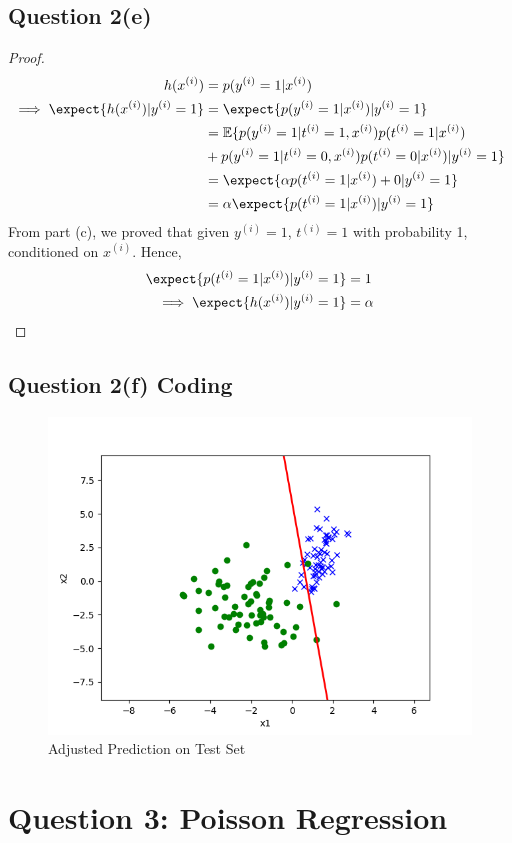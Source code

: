 \documentclass[11pt]{article}
\newcommand{\upi}[0]{^{(i)}}
\begin{document}
	\subsection{Question 2(e)}
	\begin{proof}
		\begin{align}
			h(x\upi) &= p(y\upi = 1|x\upi) \\
			\implies \expect{h(x\upi)|y\upi=1} &= \expect{p(y\upi = 1|x\upi)|y\upi=1} \\
			&= \mathbb{E}\{
			p(y\upi = 1|t\upi=1, x\upi) p(t\upi=1|x\upi) \\
			&+ p(y\upi = 1|t\upi=0, x\upi) p(t\upi=0|x\upi)
			|y\upi=1
			\} \\
			&= \expect{\alpha p(t\upi=1|x\upi) + 0|y\upi = 1} \\
			&= \alpha \expect{p(t\upi=1|x\upi)|y\upi=1}
		\end{align}
		From part (c), we proved that given $y\upi=1$, $t\upi=1$ with probability 1, conditioned on $x\upi$. Hence,
		\begin{align}
			\expect{p(t\upi=1|x\upi)|y\upi=1} &= 1 \\
			\implies \expect{h(x\upi)|y\upi=1} &= \alpha
		\end{align}
	\end{proof}
	
	\subsection{Question 2(f) Coding}
	\begin{figure}[h]
		\centering
		\includegraphics[width=0.6\linewidth]{src/posonly/posonly_adjusted_pred.png}
		\caption{Adjusted Prediction on Test Set}
	\end{figure}
	
	\newpage
	
	\section{Question 3: Poisson Regression}
\end{document}
